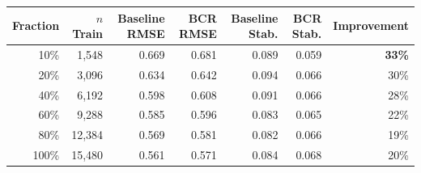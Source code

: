 \begin{tabular}{rrrrrrr}
\toprule
Fraction & $n$ Train & Baseline RMSE & BCR RMSE & Baseline Stab. & BCR Stab. & Improvement \\
\midrule
10\% & 1,548 & 0.669 & 0.681 & 0.089 & 0.059 & \textbf{33\%} \\
20\% & 3,096 & 0.634 & 0.642 & 0.094 & 0.066 & 30\% \\
40\% & 6,192 & 0.598 & 0.608 & 0.091 & 0.066 & 28\% \\
60\% & 9,288 & 0.585 & 0.596 & 0.083 & 0.065 & 22\% \\
80\% & 12,384 & 0.569 & 0.581 & 0.082 & 0.066 & 19\% \\
100\% & 15,480 & 0.561 & 0.571 & 0.084 & 0.068 & 20\% \\
\bottomrule
\end{tabular}
